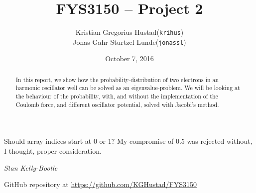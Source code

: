 \documentclass[a4paper]{article}
\begin{document}
\title{FYS3150 -- Project 2}
\author{
    \begin{tabular}{r l}
        Kristian Gregorius Hustad & (\texttt{krihus})\\
        Jonas Gahr Sturtzel Lunde & (\texttt{jonassl})
    \end{tabular}}
\date{October 7, 2016}    %

\maketitle



\setlength{\epigraphwidth}{0.75\textwidth}
\renewcommand{\epigraphflush}{center}
\renewcommand{\beforeepigraphskip}{50pt}
\renewcommand{\afterepigraphskip}{100pt}
\renewcommand{\epigraphsize}{\normalsize}

\epigraph{Should array indices start at 0 or 1?  My compromise of 0.5 was rejected without, I thought, proper consideration.}
{\textit{Stan Kelly-Bootle}}


\begin{abstract}
\noindent
In this report, we show how the probability-distribution of two electrons in an harmonic oscillator well can be solved as an eigenvalue-problem. We will be looking at the behaviour of the probability, with, and without the implementation of the Coulomb force, and different oscillator potential, solved with Jacobi's method.
\end{abstract}

\vfill


\begin{center}
    GitHub repository at \url{https://github.com/KGHustad/FYS3150}
\end{center}

\newpage

\newcommand{\half}{\frac{1}{2}}
\newcommand{\dx}{{\Delta x}}
\newcommand{\bigO}{{\mathcal{O}}}
\newcommand{\rhomax}{{\rho_{\mathrm{max}}}}
\end{document}
